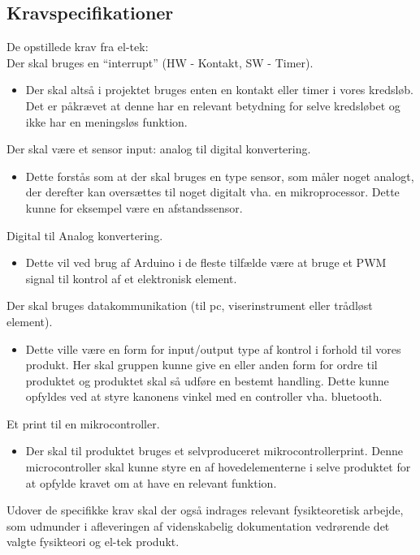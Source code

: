 \subsection{Kravspecifikationer}

De opstillede krav fra el-tek:\\

Der skal bruges en “interrupt” (HW - Kontakt, SW - Timer).
\begin{itemize}
\item Der skal altså i projektet bruges enten en kontakt eller timer i vores kredsløb. Det er påkrævet at denne har en relevant betydning for selve kredsløbet og ikke har en meningsløs funktion.
\end{itemize}



Der skal være et sensor input: analog til digital konvertering.
\begin{itemize}
\item Dette forstås som at der skal bruges en type sensor, som måler noget analogt, der derefter kan oversættes til noget digitalt vha. en mikroprocessor. Dette kunne for eksempel være en afstandssensor.
\end{itemize}

Digital til Analog konvertering.
\begin{itemize}
\item Dette vil ved brug af Arduino i de fleste tilfælde være at bruge et PWM signal til kontrol af et elektronisk element.
\end{itemize}


Der skal bruges datakommunikation (til pc, viserinstrument eller trådløst element).
\begin{itemize}
\item Dette ville være en form for input/output type af kontrol i forhold til vores produkt. Her skal gruppen kunne give en eller anden form for ordre til produktet og produktet skal så udføre en bestemt handling. Dette kunne opfyldes ved at styre kanonens vinkel med en controller vha. bluetooth.
\end{itemize}

Et print til en mikrocontroller.
\begin{itemize}
\item Der skal til produktet bruges et selvproduceret mikrocontrollerprint. Denne microcontroller skal kunne styre en af hovedelementerne i selve produktet for at opfylde kravet om at have en relevant funktion.
\end{itemize}

Udover de specifikke krav skal der også indrages relevant fysikteoretisk arbejde, som udmunder i afleveringen af videnskabelig dokumentation vedrørende det valgte fysikteori og el-tek produkt.
